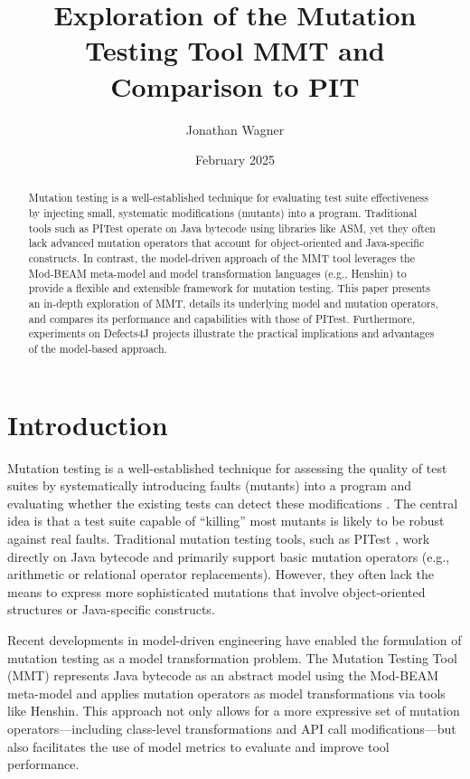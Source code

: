\documentclass[sigplan, nonacm]{acmart}
\title{Exploration of the Mutation Testing Tool MMT and Comparison to PIT}
\author{Jonathan Wagner}
\affiliation{
  \institution{Philipps-University Marburg}
  \city{Marburg}
  \country{Germany}
}
\date{February 2025}
\begin{document}
\begin{abstract}
Mutation testing is a well-established technique for evaluating test suite effectiveness by injecting small, systematic modifications (mutants) into a program. Traditional tools such as PITest operate on Java bytecode using libraries like ASM, yet they often lack advanced mutation operators that account for object-oriented and Java-specific constructs. In contrast, the model-driven approach of the MMT tool leverages the Mod-BEAM meta-model and model transformation languages (e.g., Henshin) to provide a flexible and extensible framework for mutation testing. This paper presents an in-depth exploration of MMT, details its underlying model and mutation operators, and compares its performance and capabilities with those of PITest. Furthermore, experiments on Defects4J projects illustrate the practical implications and advantages of the model-based approach.
\end{abstract}

\maketitle

\section{Introduction}
Mutation testing is a well-established technique for assessing the quality of test suites by systematically introducing faults (mutants) into a program and evaluating whether the existing tests can detect these modifications \cite{Offutt2001}. The central idea is that a test suite capable of “killing” most mutants is likely to be robust against real faults. Traditional mutation testing tools, such as PITest \cite{Coles2016}, work directly on Java bytecode and primarily support basic mutation operators (e.g., arithmetic or relational operator replacements). However, they often lack the means to express more sophisticated mutations that involve object-oriented structures or Java-specific constructs.

Recent developments in model-driven engineering have enabled the formulation of mutation testing as a model transformation problem. The Mutation Testing Tool (MMT) \cite{Bockisch2024demonstration,Bockisch2024} represents Java bytecode as an abstract model using the Mod-BEAM meta-model and applies mutation operators as model transformations via tools like Henshin. This approach not only allows for a more expressive set of mutation operators—including class-level transformations and API call modifications—but also facilitates the use of model metrics to evaluate and improve tool performance.
\end{document}
